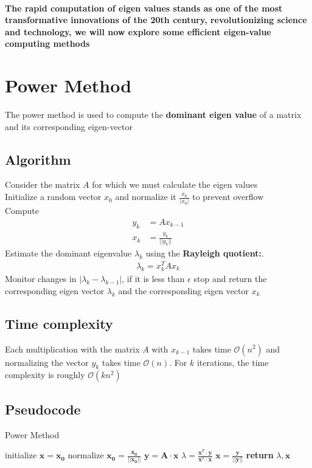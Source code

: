 \documentclass[final]{article}
\begin{document}
\paragraph{The rapid computation of eigen values stands as one of the most transformative innovations of the 20th century, revolutionizing science and technology, we will now explore some efficient eigen-value computing methods}
    \section{Power Method}
        The power method is used to compute the \textbf{dominant eigen value} of a matrix and its corresponding eigen-vector\\
        \subsection{Algorithm}
        Consider the matrix $A$ for which we must calculate the eigen values \\
        Initialize a random vector $x_0$ and normalize it $\frac{x_0}{|x_0|}$ to prevent overflow \\
        Compute
        \begin{align}
                y_k &= Ax_{k-1} \\
                x_k &= \frac{y_k}{||y_k||}
        \end{align}
        Estimate the dominant eigenvalue $\lambda_k$ using the \textbf{Rayleigh quotient:}.\\
        \begin{align}
            \lambda_k = x_k^{T}Ax_k
        \end{align}
        Monitor changes in $|\lambda_k - \lambda_{k-1}|$, if it is less than $\epsilon$ stop and return the corresponding eigen vector $\lambda_k$ and the corresponding eigen vector $x_k$
        \subsection{Time complexity}
        Each multiplication with the matrix $A$ with $x_{k-1}$ takes time $\mathcal{O}(n^2)$ and normalizing the vector $y_k$ takes time $\mathcal{O}(n)$. For $k$ iterations, the time complexity is roughly $\mathcal{O}(kn^2)$
        \subsection{Pseudocode}
        \begin{algorithm}
        \begin{algorithmic}
            \caption{Power Method}
            \State initialize $\mathbf{x} = \mathbf{x_0}$
            \State normalize $\mathbf{x_0} = \frac{\mathbf{x_0}}{||\mathbf{x_0}||}$
                \State $\mathbf{y} = \mathbf{A} \cdot \mathbf{x}$
                \State $ \lambda = \frac{\mathbf{x}^T \cdot \mathbf{y}}{\mathbf{x}^T \cdot \mathbf{x}} $
                \State $\mathbf{x} = \frac{\mathbf{y}}{\mathbf{||y||}}$
            \EndFor
        \State \textbf{return} $\lambda, \mathbf{x}$
        \end{algorithmic}
        \end{algorithm}
\end{document}
